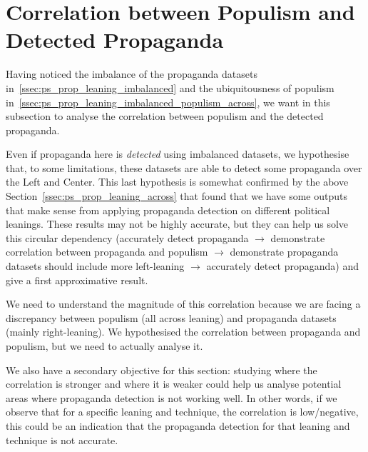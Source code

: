 \section{\statusgreen Correlation between Populism and Detected Propaganda}
\label{ssec:ps_prop_leaning_imbalanced_correlation_populism}

Having noticed the imbalance of the propaganda datasets in~\ref{ssec:ps_prop_leaning_imbalanced} and the ubiquitousness of populism in~\ref{ssec:ps_prop_leaning_imbalanced_populism_across}, we want in this subsection to analyse the correlation between populism and the detected propaganda.

Even if propaganda here is \textit{detected} using imbalanced datasets, we hypothesise that, to some limitations, these datasets are able to detect some propaganda over the Left and Center. This last hypothesis is somewhat confirmed by the above Section~\ref{ssec:ps_prop_leaning_across} that found that we have some outputs that make sense from applying propaganda detection on different political leanings.
These results may not be highly accurate, but they can help us solve this circular dependency (accurately detect propaganda $\rightarrow$ demonstrate correlation between propaganda and populism $\rightarrow$ demonstrate propaganda datasets should include more left-leaning $\rightarrow$ accurately detect propaganda) and give a first approximative result.

We need to understand the magnitude of this correlation because we are facing a discrepancy between populism (all across leaning) and propaganda datasets (mainly right-leaning).
We hypothesised the correlation between propaganda and populism, but we need to actually analyse it.

We also have a secondary objective for this section: studying where the correlation is stronger and where it is weaker could help us analyse potential areas where propaganda detection is not working well. In other words, if we observe that for a specific leaning and technique, the correlation is low/negative, this could be an indication that the propaganda detection for that leaning and technique is not accurate.



